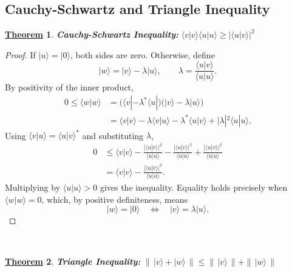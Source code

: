 \documentclass[11pt, answers]{exam}
\theoremstyle{definition}
\newtheorem{theorem}{\underline{Theorem}}[section]
\theoremstyle{bulleted}
\begin{document}
	\subsection{Cauchy-Schwartz and Triangle Inequality}
	\begin{theorem}
		\textbf{\textit{Cauchy-Schwartz Inequality:}} $\langle v|v\rangle\langle u|u\rangle
		\geq|\langle u|v\rangle|^2$
	\end{theorem}
	\begin{proof}
		If \(|u\rangle=|0\rangle\), both sides are zero. Otherwise, define
		\[
		|w\rangle=|v\rangle-\lambda|u\rangle,
		\qquad
		\lambda=\frac{\langle u|v\rangle}{\langle u|u\rangle}.
		\]
		By positivity of the inner product,
		\[
		\begin{aligned}
			0\leq\langle w|w\rangle
			&=\bigl(\langle v|-\lambda^*\langle u|\bigr)
			\bigl(|v\rangle-\lambda|u\rangle\bigr)\\
			&=\langle v|v\rangle
			-\lambda\langle v|u\rangle
			-\lambda^*\langle u|v\rangle
			+|\lambda|^2\langle u|u\rangle.
		\end{aligned}
		\]
		Using \(\langle v|u\rangle=\langle u|v\rangle^*\) and substituting \(\lambda\),
		\[
		\begin{aligned}
			0
			&\leq\langle v|v\rangle
			-\frac{|\langle u|v\rangle|^2}{\langle u|u\rangle}
			-\frac{|\langle u|v\rangle|^2}{\langle u|u\rangle}
			+\frac{|\langle u|v\rangle|^2}{\langle u|u\rangle}\\
			&=\langle v|v\rangle
			-\frac{|\langle u|v\rangle|^2}{\langle u|u\rangle}.
		\end{aligned}
		\]
		Multiplying by \(\langle u|u\rangle>0\) gives the inequality.
		Equality holds precisely when \(\langle w|w\rangle=0\), which, by positive definiteness, means
		\[
		|w\rangle=|0\rangle
		\quad\Longleftrightarrow\quad
		|v\rangle=\lambda|u\rangle.
		\]
	\end{proof}
	\ \\
	\begin{theorem}
		\textit{\textbf{Triangle Inequality:}} $
		\|\,|v\rangle+|w\rangle\,\|
		\leq\|\,|v\rangle\,\|+\|\,|w\rangle\,\|$
	\end{theorem}
\end{document}

